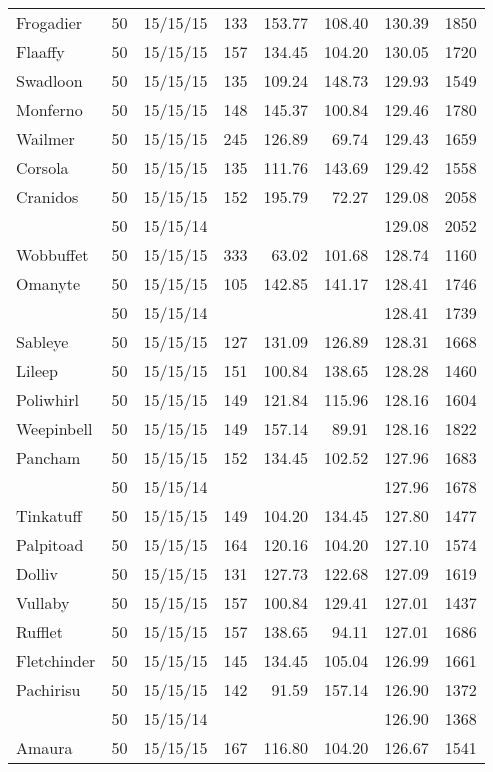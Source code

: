 \begin{longtable}{lrrrrrrr}
Frogadier & 50 & 15/15/15 & 133 & 153.77 & 108.40 & 130.39 & 1850\\
Flaaffy & 50 & 15/15/15 & 157 & 134.45 & 104.20 & 130.05 & 1720\\
Swadloon & 50 & 15/15/15 & 135 & 109.24 & 148.73 & 129.93 & 1549\\
Monferno & 50 & 15/15/15 & 148 & 145.37 & 100.84 & 129.46 & 1780\\
Wailmer & 50 & 15/15/15 & 245 & 126.89 & 69.74 & 129.43 & 1659\\
Corsola & 50 & 15/15/15 & 135 & 111.76 & 143.69 & 129.42 & 1558\\
Cranidos & 50 & 15/15/15 & 152 & 195.79 & 72.27 & 129.08 & 2058\\
 & 50 & 15/15/14 & & & & 129.08 & 2052\\
Wobbuffet & 50 & 15/15/15 & 333 & 63.02 & 101.68 & 128.74 & 1160\\
Omanyte & 50 & 15/15/15 & 105 & 142.85 & 141.17 & 128.41 & 1746\\
 & 50 & 15/15/14 & & & & 128.41 & 1739\\
Sableye & 50 & 15/15/15 & 127 & 131.09 & 126.89 & 128.31 & 1668\\
Lileep & 50 & 15/15/15 & 151 & 100.84 & 138.65 & 128.28 & 1460\\
Poliwhirl & 50 & 15/15/15 & 149 & 121.84 & 115.96 & 128.16 & 1604\\
Weepinbell & 50 & 15/15/15 & 149 & 157.14 & 89.91 & 128.16 & 1822\\
Pancham & 50 & 15/15/15 & 152 & 134.45 & 102.52 & 127.96 & 1683\\
 & 50 & 15/15/14 & & & & 127.96 & 1678\\
Tinkatuff & 50 & 15/15/15 & 149 & 104.20 & 134.45 & 127.80 & 1477\\
Palpitoad & 50 & 15/15/15 & 164 & 120.16 & 104.20 & 127.10 & 1574\\
Dolliv & 50 & 15/15/15 & 131 & 127.73 & 122.68 & 127.09 & 1619\\
Vullaby & 50 & 15/15/15 & 157 & 100.84 & 129.41 & 127.01 & 1437\\
Rufflet & 50 & 15/15/15 & 157 & 138.65 & 94.11 & 127.01 & 1686\\
Fletchinder & 50 & 15/15/15 & 145 & 134.45 & 105.04 & 126.99 & 1661\\
Pachirisu & 50 & 15/15/15 & 142 & 91.59 & 157.14 & 126.90 & 1372\\
 & 50 & 15/15/14 & & & & 126.90 & 1368\\
Amaura & 50 & 15/15/15 & 167 & 116.80 & 104.20 & 126.67 & 1541\\

\end{longtable}
